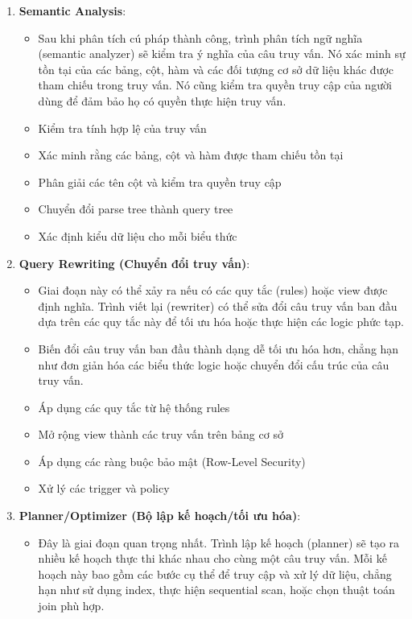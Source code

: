 \begin{enumerate}
\begin{itemize}
    \end{itemize}
     \item \textbf{Semantic Analysis}:
    \begin{itemize}
        \item  Sau khi phân tích cú pháp thành công, trình phân tích ngữ nghĩa (semantic analyzer) sẽ kiểm tra ý nghĩa của câu truy vấn. Nó xác minh sự tồn tại của các bảng, cột, hàm và các đối tượng cơ sở dữ liệu khác được tham chiếu trong truy vấn. Nó cũng kiểm tra quyền truy cập của người dùng để đảm bảo họ có quyền thực hiện truy vấn.
        \item Kiểm tra tính hợp lệ của truy vấn
        \item Xác minh rằng các bảng, cột và hàm được tham chiếu tồn tại
        \item Phân giải các tên cột và kiểm tra quyền truy cập
        \item Chuyển đổi parse tree thành query tree
        \item Xác định kiểu dữ liệu cho mỗi biểu thức
    \end{itemize}
    \item \textbf{Query Rewriting (Chuyển đổi truy vấn)}:
    \begin{itemize}
        \item Giai đoạn này có thể xảy ra nếu có các quy tắc (rules) hoặc view được định nghĩa. Trình viết lại (rewriter) có thể sửa đổi câu truy vấn ban đầu dựa trên các quy tắc này để tối ưu hóa hoặc thực hiện các logic phức tạp.
        \item Biến đổi câu truy vấn ban đầu thành dạng dễ tối ưu hóa hơn, chẳng hạn như đơn giản hóa các biểu thức logic hoặc chuyển đổi cấu trúc của câu truy vấn.
        \item Áp dụng các quy tắc từ hệ thống rules
        \item Mở rộng view thành các truy vấn trên bảng cơ sở
        \item Áp dụng các ràng buộc bảo mật (Row-Level Security)
        \item Xử lý các trigger và policy
    \end{itemize}
    \item \textbf{Planner/Optimizer (Bộ lập kế hoạch/tối ưu hóa)}:
    \begin{itemize}
        \item Đây là giai đoạn quan trọng nhất. Trình lập kế hoạch (planner) sẽ tạo ra nhiều kế hoạch thực thi khác nhau cho cùng một câu truy vấn. Mỗi kế hoạch này bao gồm các bước cụ thể để truy cập và xử lý dữ liệu, chẳng hạn như sử dụng index, thực hiện sequential scan, hoặc chọn thuật toán join phù hợp.

\end{itemize}
\end{enumerate}
